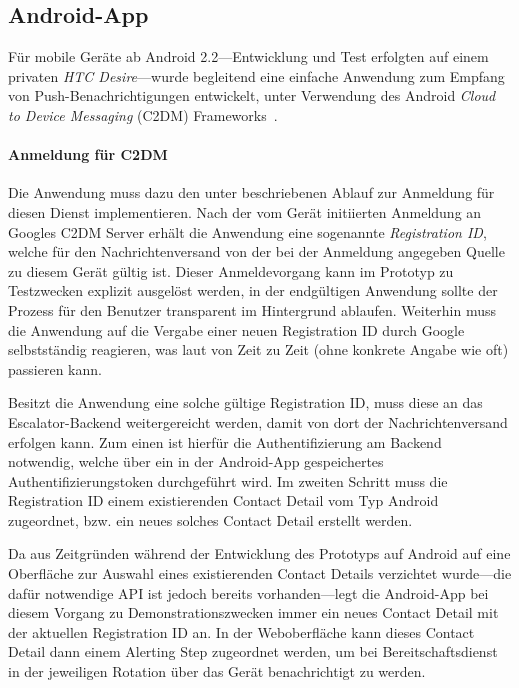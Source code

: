 \documentclass[11pt,utf8,notoc,bibnum,german,final]{zihpub}
\begin{document}

\subsection{Android-App}

Für mobile Geräte ab Android 2.2—Entwicklung und Test erfolgten auf einem
privaten \emph{HTC Desire}—wurde begleitend eine einfache Anwendung zum Empfang
von Push-Benachrichtigungen entwickelt, unter Verwendung des Android
\emph{Cloud to Device Messaging} (C2DM) Frameworks~\cite{c2dm}.

\paragraph{Anmeldung für C2DM}

Die Anwendung muss dazu den unter \cite[\emph{Lifecycle Flow}]{c2dm}
beschriebenen Ablauf zur Anmeldung für diesen Dienst implementieren. Nach der
vom Gerät initiierten Anmeldung an Googles C2DM Server erhält die Anwendung
eine sogenannte \emph{Registration ID}, welche für den Nachrichtenversand von
der bei der Anmeldung angegeben Quelle zu diesem Gerät gültig ist. Dieser
Anmeldevorgang kann im Prototyp zu Testzwecken explizit ausgelöst werden, in
der endgültigen Anwendung sollte der Prozess für den Benutzer transparent im
Hintergrund ablaufen. Weiterhin muss die Anwendung auf die Vergabe einer neuen
Registration ID durch Google selbstständig reagieren, was laut
\cite[\emph{Handling Registration Results}]{c2dm} von Zeit zu Zeit (ohne
konkrete Angabe wie oft) passieren kann.

Besitzt die Anwendung eine solche gültige Registration ID, muss diese an das
Escalator-Backend weitergereicht werden, damit von dort der Nachrichtenversand
erfolgen kann. Zum einen ist hierfür die Authentifizierung am Backend
notwendig, welche über ein in der Android-App gespeichertes
Authentifizierungstoken durchgeführt wird. Im zweiten Schritt muss die
Registration ID einem existierenden Contact Detail vom Typ Android zugeordnet,
bzw. ein neues solches Contact Detail erstellt werden.

Da aus Zeitgründen während der Entwicklung des Prototyps auf Android auf eine
Oberfläche zur Auswahl eines existierenden Contact Details verzichtet wurde—die
dafür notwendige API ist jedoch bereits vorhanden—legt die Android-App bei
diesem Vorgang zu Demonstrationszwecken immer ein neues Contact Detail mit der
aktuellen Registration ID an. In der Weboberfläche kann dieses Contact Detail
dann einem Alerting Step zugeordnet werden, um bei Bereitschaftsdienst in der
jeweiligen Rotation über das Gerät benachrichtigt zu werden.
\end{document}
